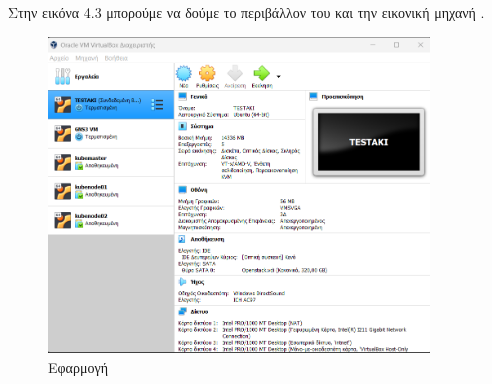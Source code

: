 Στην εικόνα 4.3 μπορούμε να δούμε το περιβάλλον του  και την εικονική μηχανή .

\begin{figure}[htb]
	\centering
	\includegraphics[width=0.9\textwidth]{graphics/virtualbox.PNG}
	\caption{Εφαρμογή  }
\end{figure}





